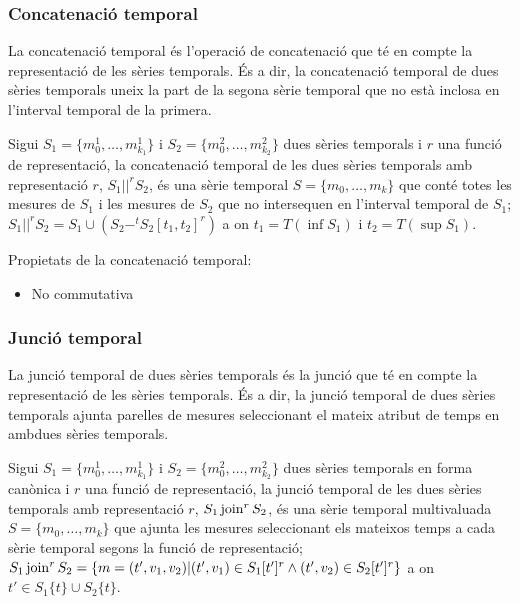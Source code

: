 \subsubsection{Concatenació temporal}

La concatenació temporal és l'operació de concatenació que té en
compte la representació de les sèries temporals.  És a dir, la
concatenació temporal de dues sèries temporals uneix la part de la
segona sèrie temporal que no està inclosa en l'interval temporal de la
primera.


\begin{definition}
  Sigui $S_1=\{m_0^1, \dotsc, m_{k_1}^1\}$ i $S_2=\{m_0^2, \dotsc,
  m_{k_2}^2\}$ dues sèries temporals i $r$ una funció de
  representació, la concatenació temporal de les dues sèries temporals
  amb representació $r$, $S_1 ||^r S_2$, és una sèrie temporal $S=\{m_0,
  \dotsc, m_k\}$ que conté totes les mesures de $S_1$ i les mesures de
  $S_2$ que no intersequen en l'interval temporal de $S_1$; $S_1 ||^r
  S_2 = S_1 \cup ( S_2 -^t S_2[t_1,t_2]^r )$ a on $t_1=T(\inf S_1)$ i
  $t_2=T(\sup S_1)$.
\end{definition}

Propietats de la concatenació temporal:
\begin{itemize}
\item No commutativa
\end{itemize}




\subsubsection{Junció temporal}

La junció temporal de dues sèries temporals és la junció que té en
compte la representació de les sèries temporals. És a dir, la junció
temporal de dues sèries temporals ajunta parelles de mesures
seleccionant el mateix atribut de temps en ambdues sèries temporals.


\begin{definition}\label{def:sgst:joint}
  Sigui $S_1=\{m_0^1, \dotsc, m_{k_1}^1\}$ i $S_2=\{m_0^2, \dotsc,
  m_{k_2}^2\}$ dues sèries temporals en forma canònica i $r$ una
  funció de representació, la junció temporal de les dues sèries
  temporals amb representació $r$, $S_1 \operatorname*{join}^r S_2$, és una sèrie
  temporal multivaluada $S=\{m_0, \dotsc, m_k\}$ que ajunta les
  mesures seleccionant els mateixos temps a cada sèrie temporal segons
  la funció de representació; $S_1 \operatorname*{join}^r S_2 = \{m=(t',v_1,v_2) |
  (t',v_1) \in S_1[t']^r \wedge (t',v_2) \in S_2[t']^r \}$ a on $t'\in
  S_1\{t\} \cup S_2\{t\}$.
\end{definition}


